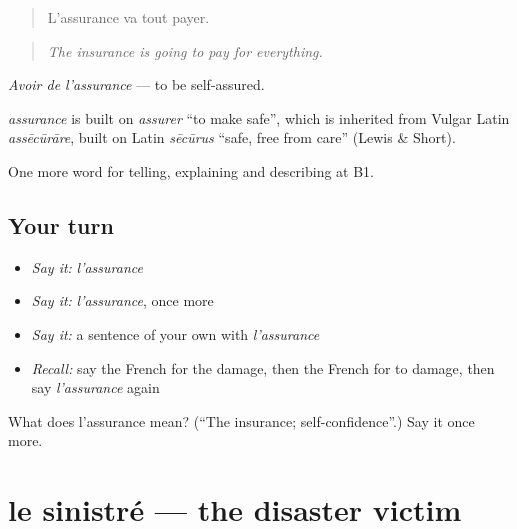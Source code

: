\begin{quote}
L'assurance va tout payer.
\end{quote}

\begin{quote}
\emph{The insurance is going to pay for everything.}
\end{quote}

\emph{Avoir de l'assurance} — to be self-assured.

\begin{cousinweb}
\emph{assurance} is built on \emph{assurer} \textquotedblleft{}to make safe\textquotedblright{}, which is inherited from Vulgar Latin \emph{assēcūrāre}, built on Latin \emph{sēcūrus} \textquotedblleft{}safe, free from care\textquotedblright{} (Lewis \& Short).
\end{cousinweb}

\begin{grammarlens}[title={What you've built}]
One more word for telling, explaining and describing at B1.
\end{grammarlens}

\subsection*{Your turn}
\begin{itemize}
\raggedright
  \item \emph{Say it:} \emph{l'assurance}
  \item \emph{Say it:} \emph{l'assurance}, once more
  \item \emph{Say it:} a sentence of your own with \emph{l'assurance}
  \item \emph{Recall:} say the French for the damage, then the French for to damage, then say \emph{l'assurance} again
\end{itemize}

\begin{tcolorbox}[breakable,colback=teal!4,colframe=teal!35!black,title={Before you move on}]
What does l'assurance mean? (\textquotedblleft{}The insurance; self-confidence\textquotedblright{}.) Say it once more.
\end{tcolorbox}
\section[le sinistré]{le sinistré — the disaster victim}

\label{lesson:FR-C307-sinistre}



